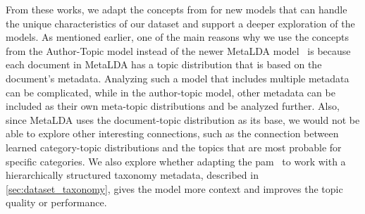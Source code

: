 From these works, we adapt the concepts from \citet{author_topic_2012} for new models that can handle the unique characteristics of our dataset and support a deeper exploration of the models.
As mentioned earlier, one of the main reasons why we use the concepts from the Author-Topic model instead of the newer MetaLDA model~\cite{MetaLDA2017} is because each document in MetaLDA has a topic distribution that is based on the document's metadata.
Analyzing such a model that includes multiple metadata can be complicated, while in the author-topic model, other metadata can be included as their own meta-topic distributions and be analyzed further.
Also, since MetaLDA uses the document-topic distribution as its base, we would not be able to explore other interesting connections, such as the connection between learned category-topic distributions and the topics that are most probable for specific categories.
We also explore whether adapting the \gls{pam}~\cite{li2006pachinko} to work with a hierarchically structured taxonomy metadata, described in \autoref{sec:dataset_taxonomy}, gives the model more context and improves the topic quality or performance.
